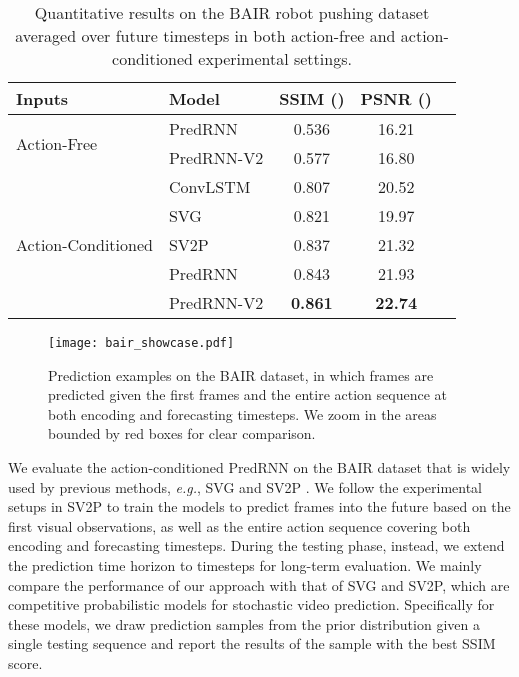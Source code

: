 \documentclass[10pt,journal,compsoc]{IEEEtran}
\begin{document}
\begin{table}[t]
\vskip 0.05in
  \caption{Quantitative results on the BAIR robot pushing dataset averaged over  future timesteps in both action-free and action-conditioned experimental settings.
  }
  \vskip -0.05in
  \label{tab:bair}
  \centering
  \begin{tabular}{llccc}
    \toprule
    Inputs & Model & SSIM () & PSNR () \\
    \midrule
    \multirow{2}{*}{Action-Free}& PredRNN & 0.536 & 16.21 \\
    & PredRNN-V2 & 0.577 & 16.80 \\
    \midrule
    \multirow{5}{*}{Action-Conditioned} & ConvLSTM \cite{wang2019memory} & 0.807 & 20.52 \\
    & SVG \cite{denton2018stochastic} & 0.821 & 19.97  \\
    & SV2P \cite{babaeizadeh2017stochastic} & 0.837 & 21.32 \\
    & PredRNN & 0.843 & 21.93 \\
    & PredRNN-V2 & \textbf{0.861} & \textbf{22.74} \\
    \bottomrule
  \end{tabular}
  \vspace{-5pt}
\end{table}

\begin{figure}[t]
  \centering
  \texttt{[image: bair\_showcase.pdf]}
\caption{Prediction examples on the BAIR dataset, in which  frames are predicted given the first  frames and the entire action sequence at both encoding and forecasting timesteps. We zoom in the areas bounded by red boxes for clear comparison.}
  \label{fig:bair_showcase}
  \vspace{-5pt}
\end{figure}



We evaluate the action-conditioned PredRNN on the BAIR dataset that is widely used by previous methods, \textit{e.g.}, SVG \cite{denton2018stochastic} and SV2P \cite{babaeizadeh2017stochastic}. 
We follow the experimental setups in SV2P to train the models to predict  frames into the future based on the first  visual observations, as well as the entire action sequence covering both encoding and forecasting timesteps.
During the testing phase, instead, we extend the prediction time horizon to  timesteps for long-term evaluation.
We mainly compare the performance of our approach with that of SVG and SV2P, which are competitive probabilistic models for stochastic video prediction. Specifically for these models, we draw  prediction samples from the prior distribution given a single testing sequence and report the results of the sample with the best SSIM score.
\end{document}
